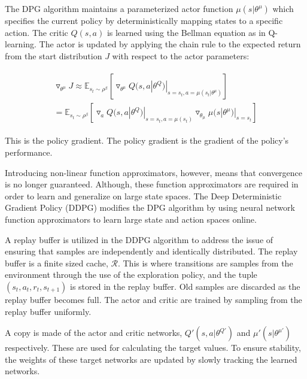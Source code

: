 \documentclass[conference]{IEEEtran}
\begin{document}
The DPG algorithm maintains a parameterized actor function $\mu(s|\theta^\mu)$ which specifies the current policy by deterministically mapping states to a specific action. The critic $Q(s,a)$ is learned using the Bellman equation as in Q-learning. The actor is updated by applying the chain rule to the expected return from the start distribution $J$ with respect to the actor parameters:

\begin{align}
\begin{split}
	\triangledown_{\theta^\mu}J\approx\mathbb{E}_{s_t\sim\rho^\beta}[\triangledown_{\theta^\mu}Q(s,a|\theta^Q)|_{s=s_t,a=\mu(s_t|\theta^\mu)}] \\
	= \mathbb{E}_{s_t\sim\rho^\beta}[\triangledown_aQ(s,a|\theta^Q)|_{s=s_t,a=\mu(s_t)}\triangledown_{\theta_\mu}\mu(s|\theta^\mu)|_{s=s_t}]
\end{split}
\end{align}
  
This is the policy gradient. The policy gradient is the gradient of the policy's performance. 

Introducing non-linear function approximators, however, means that convergence is no longer guaranteed. Although, these function approximators are required in order to learn and generalize on large state spaces. The Deep Deterministic Gradient Policy (DDPG) modifies the DPG algorithm by using neural network function approximators to learn large state and action spaces online.

A replay buffer is utilized in the DDPG algorithm to address the issue of ensuring that samples are independently and identically distributed. The replay buffer is a finite sized cache, $\mathcal{R}$. This is where transitions are samples from the environment through the use of the exploration policy, and the tuple $(s_t,a_t,r_t,s_{t+1})$ is stored in the replay buffer. Old samples are discarded as the replay buffer becomes full. The actor and critic are trained by sampling from the replay buffer uniformly. 

A copy is made of the actor and critic networks, $Q'(s,a|\theta^{Q'})$ and $\mu'(s|\theta^{\mu'})$ respectively. These are used for calculating the target values. To ensure stability, the weights of these target networks are updated by slowly tracking the learned networks.
\end{document}
